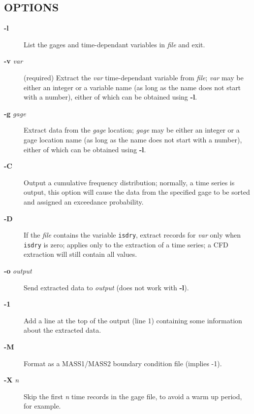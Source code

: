 \subsection*{OPTIONS\label{mass2gage_pl_OPTIONS}}\begin{description}
\item[\textbf{-l}] \mbox{}

List the gages and time-dependant variables in \textit{file} and exit.

\item[\textbf{-v} \textit{var}] \mbox{}

(required) Extract the \textit{var} time-dependant variable from \textit{file};
\textit{var} may be either an integer or a variable name (as long as the
name does not start with a number), either of which can be obtained
using \textbf{-l}.

\item[\textbf{-g} \textit{gage}] \mbox{}

Extract data from the \textit{gage} location; \textit{gage} may be
either an integer or a gage location name (as long as the name does
not start with a number), either of which can be obtained using \textbf{-l}.

\item[\textbf{-C}] \mbox{}

Output a cumulative frequency distribution; normally, a time series is
output, this option will cause the data from the specified gage to be
sorted and assigned an exceedance probability.

\item[\textbf{-D}] \mbox{}

If the \textit{file} contains the variable \texttt{isdry}, extract records for
\textit{var} only when \texttt{isdry} is zero; applies only to the extraction of a
time series; a CFD extraction will still contain all values.

\item[\textbf{-o} \textit{output}] \mbox{}

Send extracted data to \textit{output} (does not work with \textbf{-l}).

\item[\textbf{-1}] \mbox{}

Add a line at the top of the output (line 1) containing some
information about the extracted data.

\item[\textbf{-M}] \mbox{}

Format as a MASS1/MASS2 boundary condition file (implies -1).

\item[\textbf{-X} \textit{n}] \mbox{}

Skip the first \textit{n} time records in the gage file, to avoid a warm up
period, for example.

\end{description}
